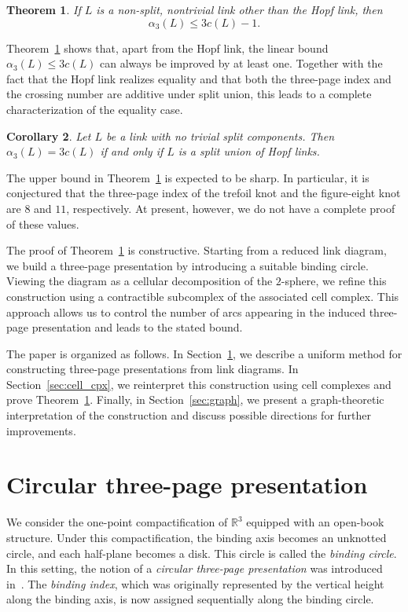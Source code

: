 \documentclass[11pt,a4paper]{amsart}
\newtheorem{theorem}{Theorem}
\newtheorem{corollary}[theorem]{Corollary}
\begin{document}
\begin{theorem}\label{thm:main}
If $L$ is a non-split, nontrivial link other than the Hopf link, then
$$
\alpha_3(L)\le 3c(L)-1.
$$
\end{theorem}

Theorem~\ref{thm:main} shows that, apart from the Hopf link,
the linear bound $\alpha_3(L)\le 3c(L)$ can always be improved by at least one.
Together with the fact that the Hopf link realizes equality
and that both the three-page index and the crossing number
are additive under split union,
this leads to a complete characterization of the equality case.

\begin{corollary}
Let $L$ be a link with no trivial split components.
Then $\alpha_3(L) = 3c(L)$ if and only if $L$ is a split union of Hopf links.
\end{corollary}

The upper bound in Theorem~\ref{thm:main} is expected to be sharp.
In particular, it is conjectured that the three-page index of the trefoil knot
and the figure-eight knot are $8$ and $11$, respectively.
At present, however, we do not have a complete proof of these values.

The proof of Theorem~\ref{thm:main} is constructive.
Starting from a reduced link diagram,
we build a three-page presentation by introducing a suitable binding circle.
Viewing the diagram as a cellular decomposition of the $2$-sphere,
we refine this construction using a contractible subcomplex of the associated
cell complex.
This approach allows us to control the number of arcs appearing
in the induced three-page presentation and leads to the stated bound.

The paper is organized as follows.
In Section~\ref{sec:circular}, we describe a uniform method for constructing
three-page presentations from link diagrams.
In Section~\ref{sec:cell_cpx}, we reinterpret this construction using
cell complexes and prove Theorem~\ref{thm:main}.
Finally, in Section~\ref{sec:graph}, we present a graph-theoretic interpretation
of the construction and discuss possible directions for further improvements.


\section{Circular three-page presentation} \label{sec:circular}

We consider the one-point compactification of $\mathbb{R}^3$ equipped with an open-book structure.
Under this compactification, the binding axis becomes an unknotted circle, and each half-plane becomes a disk.
This circle is called the \textit{binding circle}.
In this setting, the notion of a \textit{circular three-page presentation} was introduced in~\cite{Y}.
The \textit{binding index}, which was originally represented by the vertical height along the binding axis, is now assigned sequentially along the binding circle.
\end{document}
